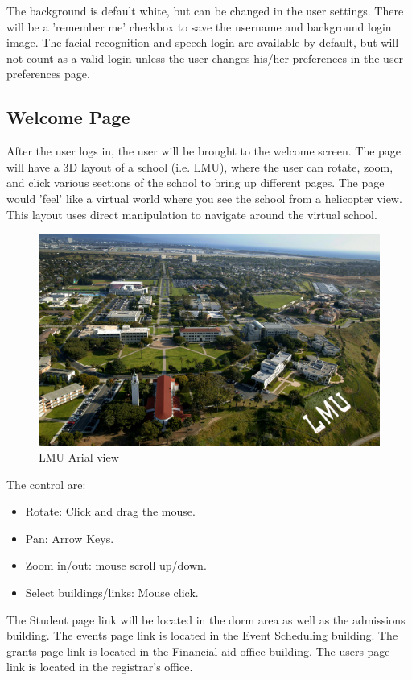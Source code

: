 \documentclass{article}
\begin{document}
The background is default white, but can be changed in the user settings.  There will be a 'remember me' checkbox to save the username and background login image.  The facial recognition and speech login are available by default, but will not count as a valid login unless the user changes his/her preferences in the user preferences page.

\subsection{Welcome Page}

After the user logs in, the user will be brought to the welcome screen.  The page will have a 3D layout of a school (i.e. LMU), where the user can rotate, zoom, and click various sections of the school to bring up different pages.  The page would 'feel' like a virtual world where you see the school from a helicopter view. This layout uses direct manipulation to navigate around the virtual school.  

\begin{figure}[H]
\centering
\includegraphics[width=4.5in]{LMU-Arial.jpg} 

\caption{LMU Arial view}
\label{LMU}
\end{figure}

The control are:

\begin{itemize}
\item Rotate: Click and drag the mouse.
\item Pan: Arrow Keys.
\item Zoom in/out: mouse scroll up/down.
\item Select buildings/links: Mouse click. 
\end{itemize}

The Student page link will be located in the dorm area as well as the admissions building.  The events page link is located in the Event Scheduling building.  The grants page link is located in the Financial aid office building.  The users page link is located in the registrar's office. 
\end{document}
